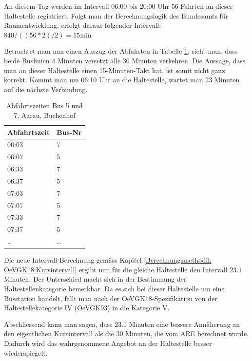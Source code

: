 An diesem Tag werden im Intervall 06:00 bis 20:00 Uhr 56 Fahrten an dieser Haltestelle registriert.
Folgt man der Berechnungslogik des Bundesamts für Raumentwicklung, erfolgt daraus folgender Intervall:
$ 840 / ((56 * 2) / 2) = 15 \text{min}$

Betrachtet man nun einen Auszug der Abfahrten in Tabelle \ref{table:Abfahrtszeiten Aarau, Buchenhof}, sieht man, dass beide Buslinien 4 Minuten versetzt alle 30 Minuten verkehren.
Die Aussage, dass man an dieser Haltestelle einen 15-Minuten-Takt hat, ist somit nicht ganz korrekt.
Kommt man um 06:10 Uhr an die Haltestelle, wartet man 23 Minuten auf die nächste Verbindung.

\begin{table}[H]
    \centering
    \begin{tabular}[c]{l l}
        \toprule
        \textbf{Abfahrtszeit}   & \textbf{Bus-Nr}\\
        \midrule
        06:03                   & 7\\
        06:07                   & 5\\
        06:33                   & 7\\
        06:37                   & 5\\
        07:03                   & 7\\
        07:07                   & 5\\
        07:33                   & 7\\
        07:37                   & 5\\
        \dots                   & \dots\\
        \bottomrule
    \end{tabular}
    \caption{Abfahrtszeiten Bus 5 und 7, Aarau, Buchenhof}
    \label{table:Abfahrtszeiten Aarau, Buchenhof}
\end{table}

Die neue Intervall-Berechnung gemäss Kapitel \ref{Berechnungsmethodik OeVGK18:Kursintervall} ergibt nun für die gleiche Haltestelle den Intervall 23.1 Minuten.
Der Unterschied macht sich in der Bestimmung der Haltestellenkategorie bemerkbar.
Da es sich bei dieser Haltestelle um eine Busstation handelt, fällt man nach der OeVGK18-Spezifikation von der Haltestellekategorie IV (OeVGK93) in die Kategorie V.

Abschliessend kann man sagen, dass 23.1 Minuten eine bessere Annäherung an den eigentlichen Kursintervall als die 30 Minuten, die vom \acs{ARE} berechnet wurde.
Dadurch wird das wahrgenommene Angebot an der Haltestelle besser wiederspiegelt.

